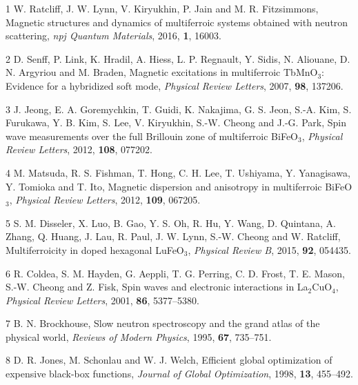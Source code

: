 \documentclass[
]{article}
\newenvironment{cslreferences}%
  {}%
  {\par}
\begin{document}
\hypertarget{refs}{}
\begin{cslreferences}
\leavevmode\hypertarget{ref-ratcliff2016review}{}%
1 W. Ratcliff, J. W. Lynn, V. Kiryukhin, P. Jain and M. R. Fitzsimmons,
Magnetic structures and dynamics of multiferroic systems obtained with
neutron scattering, \emph{npj Quantum Materials}, 2016, \textbf{1},
16003.

\leavevmode\hypertarget{ref-senff2007tbmno3}{}%
2 D. Senff, P. Link, K. Hradil, A. Hiess, L. P. Regnault, Y. Sidis, N.
Aliouane, D. N. Argyriou and M. Braden, Magnetic excitations in
multiferroic TbMnO\(_3\): Evidence for a hybridized soft mode,
\emph{Physical Review Letters}, 2007, \textbf{98}, 137206.

\leavevmode\hypertarget{ref-jeong2012bifeo3}{}%
3 J. Jeong, E. A. Goremychkin, T. Guidi, K. Nakajima, G. S. Jeon, S.-A.
Kim, S. Furukawa, Y. B. Kim, S. Lee, V. Kiryukhin, S.-W. Cheong and
J.-G. Park, Spin wave measurements over the full Brillouin zone of
multiferroic BiFeO\(_3\), \emph{Physical Review Letters}, 2012,
\textbf{108}, 077202.

\leavevmode\hypertarget{ref-matsuda2012bifeo3}{}%
4 M. Matsuda, R. S. Fishman, T. Hong, C. H. Lee, T. Ushiyama, Y.
Yanagisawa, Y. Tomioka and T. Ito, Magnetic dispersion and anisotropy in
multiferroic BiFeO\(_3\), \emph{Physical Review Letters}, 2012,
\textbf{109}, 067205.

\leavevmode\hypertarget{ref-disseler2015lufeo3}{}%
5 S. M. Disseler, X. Luo, B. Gao, Y. S. Oh, R. Hu, Y. Wang, D. Quintana,
A. Zhang, Q. Huang, J. Lau, R. Paul, J. W. Lynn, S.-W. Cheong and W.
Ratcliff, Multiferroicity in doped hexagonal LuFeO\(_3\), \emph{Physical
Review B}, 2015, \textbf{92}, 054435.

\leavevmode\hypertarget{ref-coldea2001la2cuo4}{}%
6 R. Coldea, S. M. Hayden, G. Aeppli, T. G. Perring, C. D. Frost, T. E.
Mason, S.-W. Cheong and Z. Fisk, Spin waves and electronic interactions
in La\(_2\)CuO\(_4\), \emph{Physical Review Letters}, 2001, \textbf{86},
5377--5380.

\leavevmode\hypertarget{ref-brockhouse1995}{}%
7 B. N. Brockhouse, Slow neutron spectroscopy and the grand atlas of the
physical world, \emph{Reviews of Modern Physics}, 1995, \textbf{67},
735--751.

\leavevmode\hypertarget{ref-jones1998ei}{}%
8 D. R. Jones, M. Schonlau and W. J. Welch, Efficient global
optimization of expensive black-box functions, \emph{Journal of Global
Optimization}, 1998, \textbf{13}, 455--492.


\end{cslreferences}
\end{document}

